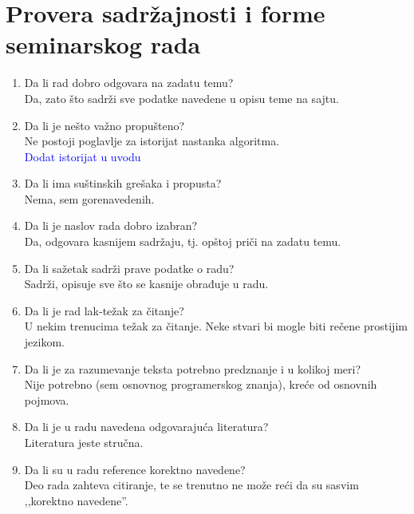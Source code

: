 \documentclass[a4paper]{report}
\newcommand{\odgovor}[1]{\textcolor{blue}{#1}}
\begin{document}
\section{Provera sadržajnosti i forme seminarskog rada}

\begin{enumerate}
\item Da li rad dobro odgovara na zadatu temu?\\
Da, zato što sadrži sve podatke navedene u opisu teme na sajtu. 

\item Da li je nešto važno propušteno?\\
Ne postoji poglavlje za istorijat nastanka algoritma.\\
\odgovor{Dodat istorijat u uvodu\\}

\item Da li ima suštinskih grešaka i propusta?\\
Nema, sem gorenavedenih.

\item Da li je naslov rada dobro izabran?\\
Da, odgovara kasnijem sadržaju, tj. opštoj priči na zadatu temu. 

\item Da li sažetak sadrži prave podatke o radu?\\
Sadrži, opisuje sve što se kasnije obrađuje u radu.

\item Da li je rad lak-težak za čitanje?\\
U nekim trenucima težak za čitanje. Neke stvari bi mogle biti rečene prostijim jezikom. 

\item Da li je za razumevanje teksta potrebno predznanje i u kolikoj meri?\\
Nije potrebno (sem osnovnog programerskog znanja), kreće od osnovnih pojmova. 

\item Da li je u radu navedena odgovarajuća literatura?\\
Literatura jeste stručna.

\item Da li su u radu reference korektno navedene?\\
Deo rada zahteva citiranje, te se trenutno ne može reći da su sasvim ,,korektno navedene''.


\end{enumerate}
\end{document}
